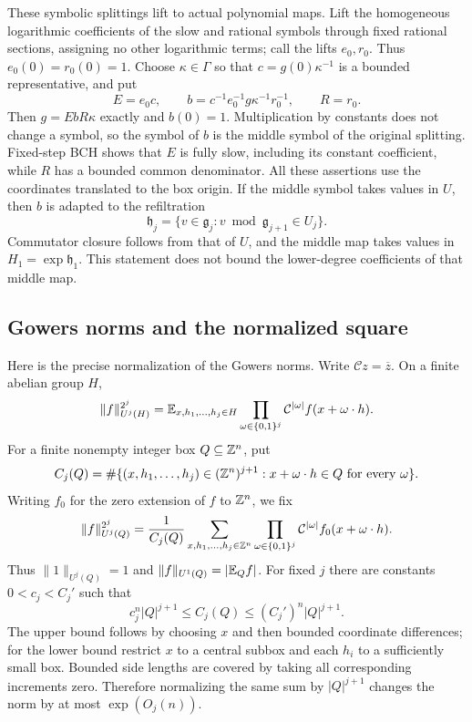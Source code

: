 These symbolic splittings lift to actual polynomial maps.  Lift the
homogeneous logarithmic coefficients of the slow and rational symbols
through fixed rational sections, assigning no other logarithmic terms;
call the lifts $e_0,r_0$.  Thus $e_0(0)=r_0(0)=1$.  Choose
$\kappa\in\Gamma$ so that $c=g(0)\kappa^{-1}$ is a bounded
representative, and put
\[
 E=e_0c,\qquad
 b=c^{-1}e_0^{-1}g\kappa^{-1}r_0^{-1},\qquad R=r_0.
\]
Then $g=EbR\kappa$ exactly and $b(0)=1$.  Multiplication by
constants does not change a symbol, so the symbol of $b$ is the
middle symbol of the original splitting.  Fixed-step BCH shows that
$E$ is fully slow, including its constant coefficient, while $R$
has a bounded common denominator.  All these assertions use the
coordinates translated to the box origin.  If the middle symbol takes
values in $U$, then $b$ is adapted to the refiltration
\[
 \mathfrak h_j=\{v\in\mathfrak g_j:
                  v\bmod\mathfrak g_{j+1}\in U_j\}.
\]
Commutator closure follows from that of $U$, and the middle map takes
values in $H_1=\exp\mathfrak h_1$.  This statement does not bound
the lower-degree coefficients of that middle map.

\subsection{Gowers norms and the normalized square}

Here is the precise normalization of the Gowers norms.  Write
$\mathcal C z=\overline z$.  On a finite abelian group $H$,
\[
 \|f\|_{U^j(H)}^{2^j}
 =\mathbb E_{x,h_1,\ldots,h_j\in H}
   \prod_{\omega\in\{0,1\}^j}
   \mathcal C^{|\omega|}f(x+\omega\cdot h).
\]
For a finite nonempty integer box $Q\subseteq\mathbb Z^n$, put
\[
 C_j(Q)=\#\{(x,h_1,\ldots,h_j)\in(\mathbb Z^n)^{j+1}:
                    x+\omega\cdot h\in Q\text{ for every }\omega\}.
\]
Writing $f_0$ for the zero extension of $f$ to $\mathbb Z^n$, we fix
\begin{equation}\label{prelim:box-gowers}
 \|f\|_{U^j(Q)}^{2^j}
 =\frac{1}{C_j(Q)}
   \sum_{x,h_1,\ldots,h_j\in\mathbb Z^n}
   \prod_{\omega\in\{0,1\}^j}
      \mathcal C^{|\omega|}f_0(x+\omega\cdot h).
\end{equation}
Thus $\|1\|_{U^j(Q)}=1$ and $\|f\|_{U^1(Q)}=|\mathbb E_Qf|$.
For fixed $j$ there are constants $0<c_j<C_j'$ such that
\[
 c_j^n|Q|^{j+1}\leq C_j(Q)\leq (C_j')^n|Q|^{j+1}.
\]
The upper bound follows by choosing $x$ and then bounded coordinate
differences; for the lower bound restrict $x$ to a central subbox
and each $h_i$ to a sufficiently small box.  Bounded side lengths
are covered by taking all corresponding increments zero.  Therefore
normalizing the same sum by $|Q|^{j+1}$ changes the norm by at
most $\exp(O_j(n))$.

